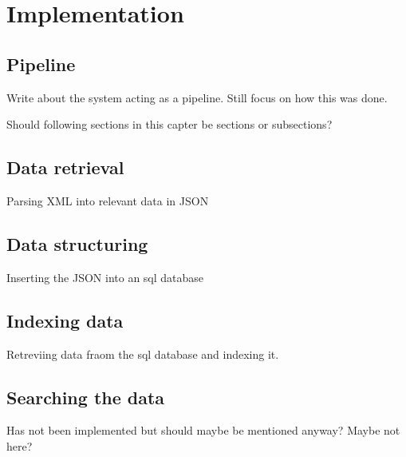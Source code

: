 
\chapter{Implementation}

\section{Pipeline}

Write about the system acting as a pipeline.
Still focus on how this was done.

Should following sections in this capter be sections or subsections?

\section{Data retrieval}

Parsing XML into relevant data in JSON

\section{Data structuring}

Inserting the JSON into an sql database

\section{Indexing data}

Retreviing data fraom the sql database and indexing it.

\section{Searching the data}

Has not been implemented but should maybe be mentioned anyway? Maybe not here?


\cleardoublepage